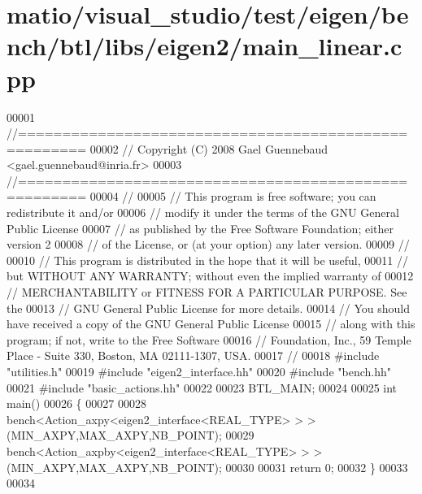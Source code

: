 \hypertarget{matio_2visual__studio_2test_2eigen_2bench_2btl_2libs_2eigen2_2main__linear_8cpp_source}{}\section{matio/visual\+\_\+studio/test/eigen/bench/btl/libs/eigen2/main\+\_\+linear.cpp}
\label{matio_2visual__studio_2test_2eigen_2bench_2btl_2libs_2eigen2_2main__linear_8cpp_source}

\begin{DoxyCode}
00001 \textcolor{comment}{//=====================================================}
00002 \textcolor{comment}{// Copyright (C) 2008 Gael Guennebaud <gael.guennebaud@inria.fr>}
00003 \textcolor{comment}{//=====================================================}
00004 \textcolor{comment}{//}
00005 \textcolor{comment}{// This program is free software; you can redistribute it and/or}
00006 \textcolor{comment}{// modify it under the terms of the GNU General Public License}
00007 \textcolor{comment}{// as published by the Free Software Foundation; either version 2}
00008 \textcolor{comment}{// of the License, or (at your option) any later version.}
00009 \textcolor{comment}{//}
00010 \textcolor{comment}{// This program is distributed in the hope that it will be useful,}
00011 \textcolor{comment}{// but WITHOUT ANY WARRANTY; without even the implied warranty of}
00012 \textcolor{comment}{// MERCHANTABILITY or FITNESS FOR A PARTICULAR PURPOSE.  See the}
00013 \textcolor{comment}{// GNU General Public License for more details.}
00014 \textcolor{comment}{// You should have received a copy of the GNU General Public License}
00015 \textcolor{comment}{// along with this program; if not, write to the Free Software}
00016 \textcolor{comment}{// Foundation, Inc., 59 Temple Place - Suite 330, Boston, MA  02111-1307, USA.}
00017 \textcolor{comment}{//}
00018 \textcolor{preprocessor}{#include "utilities.h"}
00019 \textcolor{preprocessor}{#include "eigen2\_interface.hh"}
00020 \textcolor{preprocessor}{#include "bench.hh"}
00021 \textcolor{preprocessor}{#include "basic\_actions.hh"}
00022 
00023 BTL\_MAIN;
00024 
00025 \textcolor{keywordtype}{int} main()
00026 \{
00027 
00028   bench<Action\_axpy<eigen2\_interface<REAL\_TYPE> > >(MIN\_AXPY,MAX\_AXPY,NB\_POINT);
00029   bench<Action\_axpby<eigen2\_interface<REAL\_TYPE> > >(MIN\_AXPY,MAX\_AXPY,NB\_POINT);
00030   
00031   \textcolor{keywordflow}{return} 0;
00032 \}
00033 
00034 
\end{DoxyCode}
